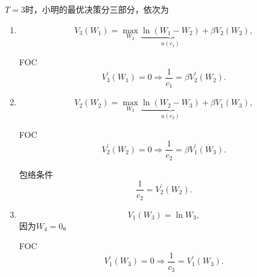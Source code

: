 $T=3$时，小明的最优决策分三部分，依次为
\begin{enumerate}
  \item
  \begin{equation}
    \label{eq:dp-cake-fin-t-3-A}
    V_{3} \left( W_{1} \right)
    = \max_{W_{2}} \underbrace{
    \ln \left( W_{1} - W_{2} \right)
    }_{u \left( c_{1} \right)}
    + \beta V_{2} \left( W_{2} \right),
  \end{equation}

  FOC
  \begin{equation}
    \label{eq:dp-cake-fin-t-3-A-foc}
    V_{3}^{'} \left( W_{1} \right) = 0 \Rightarrow \frac{1}{c_{1}} = \beta V_{2}^{'} \left( W_{2} \right).
  \end{equation}

  \item
  \begin{equation}
    \label{eq:dp-cake-fin-t-3-B}
    V_{2} \left( W_{2} \right)
    = \max_{W_{3}} \underbrace{
    \ln \left( W_{2} - W_{3} \right)
    }_{u \left( c_{2} \right)}
    + \beta V_{1} \left( W_{3} \right),
  \end{equation}

  FOC
  \begin{equation}
    \label{eq:dp-cake-fin-t-3-B-foc}
    V_{2}^{'} \left( W_{2} \right) = 0 \Rightarrow \frac{1}{c_{2}} = \beta V_{1}^{'} \left( W_{3} \right).
  \end{equation}

  包络条件
  \begin{equation}
    \label{eq:dp-cake-fin-t-3-B-envelope}
    \frac{1}{c_{2}} = V_{2}^{'} \left( W_{2} \right).
  \end{equation}

  \item
  \begin{equation}
    \label{eq:dp-cake-fin-t-3-C}
    V_{1} \left( W_{3} \right)
    = \ln W_{3},
  \end{equation}
  因为$W_{4}=0$。

  FOC
  \begin{equation}
    \label{eq:dp-cake-fin-t-3-C-foc}
    V_{1}^{'} \left( W_{3} \right) = 0 \Rightarrow \frac{1}{c_{3}} = V_{1}^{'} \left( W_{3} \right).
  \end{equation}
\end{enumerate}

